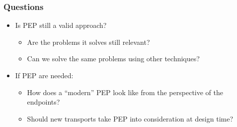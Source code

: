 \begin{frame}
  \frametitle{Questions}
  \begin{itemize}
    \item Is PEP still a valid approach?
    \begin{itemize}
      \item Are the problems it solves still relevant?
      \item Can we solve the same problems using other techniques?
    \end{itemize}
    \item If PEP are needed:
    \begin{itemize}
      \item How does a ``modern'' PEP look like from the perspective of the endpoints?
      \item Should new transports take PEP into consideration at design time?
    \end{itemize}
  \end{itemize}
\end{frame}
